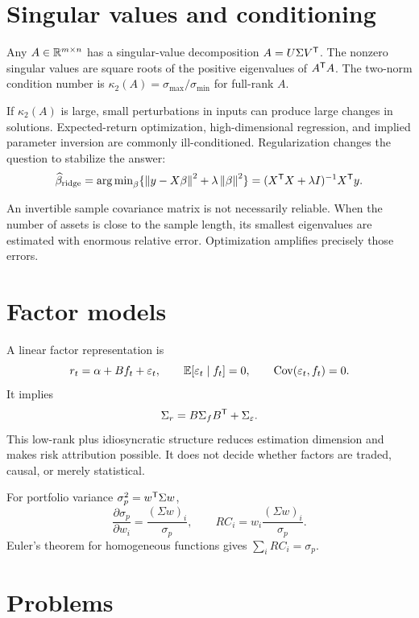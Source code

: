 \section{Singular values and conditioning}

Any $A\in\mathbb R^{m\times n}$ has a singular-value decomposition
$A=U\Sigma V^\mathsf T$. The nonzero singular values are square roots of the
positive eigenvalues of $A^\mathsf T A$. The two-norm condition number is
$\kappa_2(A)=\sigma_{\max}/\sigma_{\min}$ for full-rank $A$.

If $\kappa_2(A)$ is large, small perturbations in inputs can produce large changes in
solutions. Expected-return optimization, high-dimensional regression, and implied
parameter inversion are commonly ill-conditioned. Regularization changes the
question to stabilize the answer:
\[
\widehat\beta_{\text{ridge}}
=\operatorname{arg\,min}_\beta\{\left\lVert y-X\beta\right\rVert^2+\lambda\left\lVert\beta\right\rVert^2\}
=(X^\mathsf T X+\lambda I)^{-1}X^\mathsf T y.
\]

\begin{warning}
An invertible sample covariance matrix is not necessarily reliable. When the number
of assets is close to the sample length, its smallest eigenvalues are estimated with
enormous relative error. Optimization amplifies precisely those errors.
\end{warning}

\section{Factor models}

A linear factor representation is
\[
r_t=\alpha+Bf_t+\varepsilon_t,\qquad
\operatorname{\mathbb E}[\varepsilon_t\mid f_t]=0,\qquad
\operatorname{Cov}(\varepsilon_t,f_t)=0.
\]
It implies
\[
\Sigma_r=B\Sigma_fB^\mathsf T+\Sigma_\varepsilon.
\]
This low-rank plus idiosyncratic structure reduces estimation dimension and makes
risk attribution possible. It does not decide whether factors are traded, causal,
or merely statistical.

\begin{example}
For portfolio variance $\sigma_p^2=w^\mathsf T\Sigma w$,
\[
\frac{\partial\sigma_p}{\partial w_i}
=\frac{(\Sigma w)_i}{\sigma_p},\qquad
RC_i=w_i\frac{(\Sigma w)_i}{\sigma_p}.
\]
Euler's theorem for homogeneous functions gives $\sum_iRC_i=\sigma_p$.
\end{example}

\section{Problems}

